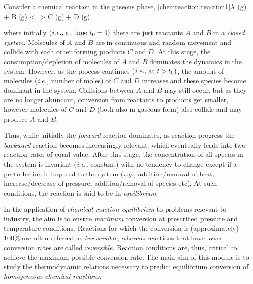\documentclass[12pts,a4paper,amsmath,amssymb,floatfix]{article}%
\makeatletter
\newcommand{\eg}{{\it e.g., }}
\newcommand{\ie}{{\it i.e., }}
\newcounter{reaction}
\renewcommand\thereaction{R6.\,\arabic{reaction}}
\newcommand\reactiontag{\refstepcounter{reaction}\tag{\thereaction}}
\newcommand\reaction@[2][]{\begin{equation}\ce{#2}%
\ifx\@empty#1\@empty\else\label{#1}\fi%
\reactiontag\end{equation}}
\newcommand\reaction@nonumber[1]{\begin{equation*}\ce{#1}%
\end{equation*}}
\newcommand\reaction{\@ifstar{\reaction@nonumber}{\reaction@}}
\makeatother
\begin{document}
Consider a chemical reaction in the gaseous phase,
     \reaction[chemreaction:reaction1]{A (g) + B (g) <=> C (g) + D (g)}

\noindent where initially $\left(\text{\ie at time } t_{0}=0\right)$ there are just reactants $A$ and $B$ in a {\it closed system}. Molecules of $A$ and $B$ are in continuous and random movement and collide with each other forming products $C$ and $D$. At this stage, the consumption/depletion of molecules of $A$ and $B$ dominates the dynamics in the system. However, as the process continues $\left(\text{\ie at } t > t_{0}\right)$, the amount of molecules (\ie number of moles) of $C$ and $D$ increases and these species become dominant in the system. Collisions between $A$ and $B$ may still occur, but as they are no longer abundant, conversion from reactants to products get smaller, however molecules of $C$ and $D$ (both also in gaseous form) also collide and may produce $A$ and $B$. 

Thus, while initially the {\it forward} reaction dominates, as reaction progress the {\it backward} reaction becomes increasingly relevant, which eventually leads into two reaction rates of equal value. After this stage, the concentration of all species in the system is invariant (\ie constant) with no tendency to change except if a perturbation is imposed to the system (\eg addition/removal of heat, increase/decrease of pressure, addition/removal of species etc). At such conditions, the reaction is said to be in {\it equilibrium}. 

In the application of {\it chemical reaction equilibrium} to problems relevant to industry, the aim is to ensure {\it maximum} conversion at prescribed pressure and temperature conditions. Reactions for which the conversion is (approximately) 100$\%$ are often referred as {\it irreversible}, whereas reactions that have lower conversion rates are called {\it reversible}. Reaction conditions are, thus, critical to achieve the maximum possible conversion rate. The main aim of this module is to study the thermodynamic relations necessary to predict equilibrium conversion of {\it homogeneous chemical reactions}. 

\end{document}

